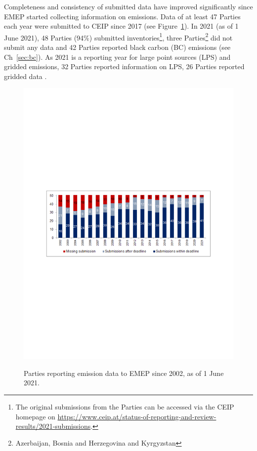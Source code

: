 Completeness and consistency of submitted data have improved significantly since EMEP started collecting information on emissions. Data of at least 47 Parties each year were submitted to CEIP since 2017 (see Figure~\ref{fig:CEIP1}). In 2021 (as of 1 June 2021), 48 Parties (94\%) submitted inventories\footnote{The original submissions from the Parties can be accessed via the CEIP homepage on \url{https://www.ceip.at/status-of-reporting-and-review-results/2021-submissions}.}, three Parties\footnote{Azerbaijan, Bosnia and Herzegovina and Kyrgyzstan} did not submit any data and 42 Parties reported black carbon (BC) emissions (see Ch~\ref{sec:bc}). As 2021 is a reporting year for large point sources (LPS) and gridded emissions, 32 Parties reported information on LPS, 26 Parties reported gridded data  \citep{CEIP2021}.

\begin{figure}[h]
\centering
{\includegraphics*[viewport=60 295 550 500,clip,scale=0.75]{FIGS_CEIP/Fig1.pdf}}
\caption{Parties reporting emission data to EMEP since 2002, as of 1 June 2021.}
\label{fig:CEIP1}
\end{figure}

